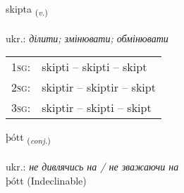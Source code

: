 \documentclass[frontgrid, backgrid]{flacards}\usepackage[]{graphicx}\usepackage[]{xcolor}
\begin{document}
\renewcommand{\flhead}{\vskip5pt \fboxsep=0pt {\small\bfseries\footnotesize Sagnorð | дієслово}}
\renewcommand{\fcfoot}{\vskip5pt \fboxsep=0pt \hspace{2pt}{\small\bfseries\footnotesize 1K}}

\renewcommand{\blhead}{\vskip5pt {\small\bfseries\footnotesize Sagnorð | дієслово }}
\renewcommand{\bcfoot}{\vskip5pt \hspace{2pt}{\small\bfseries\footnotesize 1K}}


{skipta \small{\textsubscript{(\textit{v.})}} \\[1ex] %
\textphonetic{[scɪfta]} \\
ukr.: \emph{ділити; змінювати; обмінювати} \\  [2ex]
\renewcommand*{\arraystretch}{0.8}
\begin{tabular}{p{1cm}l}
\textsc{1sg}: & skipti -- skipti -- skipt \\ 
\textsc{2sg}: & skiptir -- skiptir -- skipt \\ 
\textsc{3sg}: & skiptir -- skipti -- skipt \\ 
\end{tabular}
}


\renewcommand{\flhead}{\vskip5pt \fboxsep=0pt {\small\bfseries\footnotesize Samtenging | сполучник}}
\renewcommand{\fcfoot}{\vskip5pt \fboxsep=0pt \hspace{2pt}{\small\bfseries\footnotesize 1K}}

\renewcommand{\blhead}{\vskip5pt {\small\bfseries\footnotesize Samtenging | сполучник }}
\renewcommand{\bcfoot}{\vskip5pt \hspace{2pt}{\small\bfseries\footnotesize 1K}}


{þótt \small{\textsubscript{(\textit{conj.})}} \\[1ex]
\textphonetic{[θouht]} \\
ukr.: \emph{не дивлячись на / не зважаючи на} \\  [2ex]
þótt (Indeclinable)}
\end{document}
